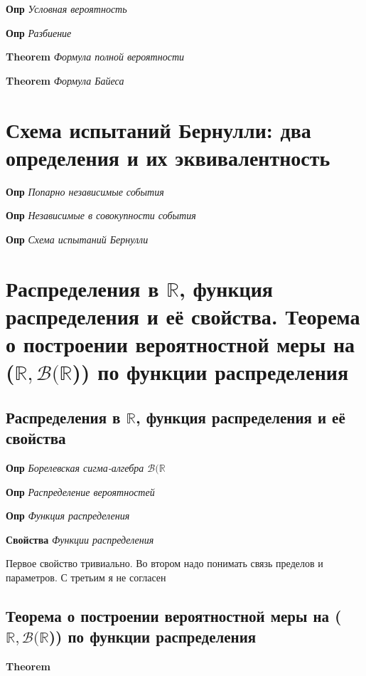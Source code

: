 \documentclass[a4paper, 14pt]{article}
\begin{document}
    \textbf{Опр} \textit{Условная вероятность}
    
    \textbf{Опр} \textit{Разбиение}

    \textbf{Theorem} \textit{Формула полной вероятности}
    
    \textbf{Theorem} \textit{Формула Байеса}
    
    \section{Схема испытаний Бернулли: два определения и их эквивалентность}
    
    \textbf{Опр} \textit{Попарно независимые события}
    
    \textbf{Опр} \textit{Независимые в совокупности события}
    
    \textbf{Опр} \textit{Схема испытаний Бернулли}
    
    \section{Распределения в $\mathbb{R}$, функция распределения и её свойства.
    Теорема о построении вероятностной меры на ($\mathbb{R}, \mathcal{B}(\mathbb{R}$)) по функции распределения}
    
    \subsection{Распределения в $\mathbb{R}$, функция распределения и её свойства}
    
    \textbf{Опр} \textit{Борелевская сигма-алгебра $\mathcal{B}(\mathbb{R}$}
    
    \textbf{Опр} \textit{Распределение вероятностей}
    
    \textbf{Опр} \textit{Функция распределения}
    
    \textbf{Свойства} \textit{Функции распределения}
    
    Первое свойство тривиально.
    Во втором надо понимать связь пределов и параметров.
    С третьим я не согласен
    
    \subsection{Теорема о построении вероятностной меры на ($\mathbb{R}, \mathcal{B}(\mathbb{R}$)) по функции
    распределения}
    
    \textbf{Theorem}
    
\end{document}
